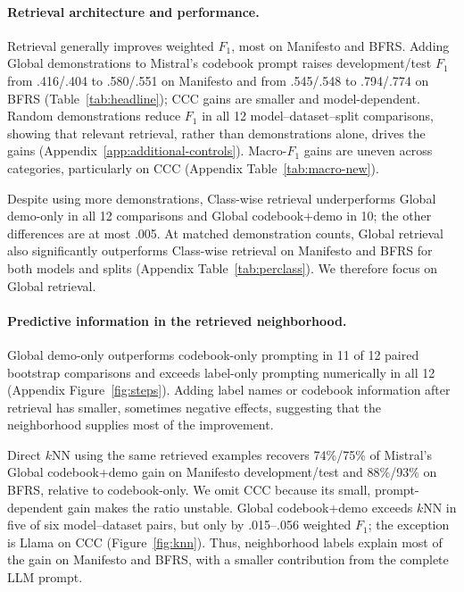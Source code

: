 \documentclass[11pt]{article}
\begin{document}
\paragraph{Retrieval architecture and performance.}

Retrieval generally improves weighted \(F_1\), most on Manifesto and BFRS. Adding Global demonstrations to Mistral's codebook prompt raises development/test \(F_1\) from .416/.404 to .580/.551 on Manifesto and from .545/.548 to .794/.774 on BFRS (Table~\ref{tab:headline}); CCC gains are smaller and model-dependent. Random demonstrations reduce \(F_1\) in all 12 model--dataset--split comparisons, showing that relevant retrieval, rather than demonstrations alone, drives the gains (Appendix~\ref{app:additional-controls}). Macro-\(F_1\) gains are uneven across categories, particularly on CCC (Appendix Table~\ref{tab:macro-new}).

Despite using more demonstrations, Class-wise retrieval underperforms Global demo-only in all 12 comparisons and Global codebook+demo in 10; the other differences are at most .005. At matched demonstration counts, Global retrieval also significantly outperforms Class-wise retrieval on Manifesto and BFRS for both models and splits (Appendix Table~\ref{tab:perclass}). We therefore focus on Global retrieval.

\paragraph{Predictive information in the retrieved neighborhood.}

Global demo-only outperforms codebook-only prompting in 11 of 12 paired bootstrap comparisons and exceeds label-only prompting numerically in all 12 (Appendix Figure~\ref{fig:steps}). Adding label names or codebook information after retrieval has smaller, sometimes negative effects, suggesting that the neighborhood supplies most of the improvement.


Direct \(k\)NN using the same retrieved examples recovers 74\%/75\% of Mistral's Global codebook+demo gain on Manifesto development/test and 88\%/93\% on BFRS, relative to codebook-only. We omit CCC because its small, prompt-dependent gain makes the ratio unstable. Global codebook+demo exceeds \(k\)NN in five of six model–dataset pairs, but only by .015--.056 weighted \(F_1\); the exception is Llama on CCC (Figure~\ref{fig:knn}). Thus, neighborhood labels explain most of the gain on Manifesto and BFRS, with a smaller contribution from the complete LLM prompt.
\end{document}
